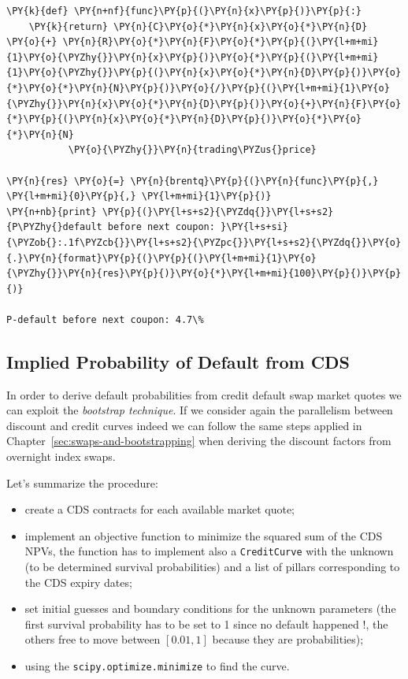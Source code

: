 \begin{attention}
\begin{Verbatim}[commandchars=\\\{\}]
\PY{k}{def} \PY{n+nf}{func}\PY{p}{(}\PY{n}{x}\PY{p}{)}\PY{p}{:}
    \PY{k}{return} \PY{n}{C}\PY{o}{*}\PY{n}{x}\PY{o}{*}\PY{n}{D} \PY{o}{+} \PY{n}{R}\PY{o}{*}\PY{n}{F}\PY{o}{*}\PY{p}{(}\PY{l+m+mi}{1}\PY{o}{\PYZhy{}}\PY{n}{x}\PY{p}{)}\PY{o}{*}\PY{p}{(}\PY{l+m+mi}{1}\PY{o}{\PYZhy{}}\PY{p}{(}\PY{n}{x}\PY{o}{*}\PY{n}{D}\PY{p}{)}\PY{o}{*}\PY{o}{*}\PY{n}{N}\PY{p}{)}\PY{o}{/}\PY{p}{(}\PY{l+m+mi}{1}\PY{o}{\PYZhy{}}\PY{n}{x}\PY{o}{*}\PY{n}{D}\PY{p}{)}\PY{o}{+}\PY{n}{F}\PY{o}{*}\PY{p}{(}\PY{n}{x}\PY{o}{*}\PY{n}{D}\PY{p}{)}\PY{o}{*}\PY{o}{*}\PY{n}{N}
           \PY{o}{\PYZhy{}}\PY{n}{trading\PYZus{}price}
	
\PY{n}{res} \PY{o}{=} \PY{n}{brentq}\PY{p}{(}\PY{n}{func}\PY{p}{,} \PY{l+m+mi}{0}\PY{p}{,} \PY{l+m+mi}{1}\PY{p}{)}
\PY{n+nb}{print} \PY{p}{(}\PY{l+s+s2}{\PYZdq{}}\PY{l+s+s2}{P\PYZhy{}default before next coupon: }\PY{l+s+si}{\PYZob{}:.1f\PYZcb{}}\PY{l+s+s2}{\PYZpc{}}\PY{l+s+s2}{\PYZdq{}}\PY{o}{.}\PY{n}{format}\PY{p}{(}\PY{p}{(}\PY{l+m+mi}{1}\PY{o}{\PYZhy{}}\PY{n}{res}\PY{p}{)}\PY{o}{*}\PY{l+m+mi}{100}\PY{p}{)}\PY{p}{)}

P-default before next coupon: 4.7\%
\end{Verbatim}
\end{attention}

\subsection{Implied Probability of Default from CDS}\label{default-probabilities-and-cds}

In order to derive default probabilities from credit default swap market quotes we can exploit the \emph{bootstrap technique}. If we consider again the parallelism between discount and credit curves indeed we can follow the same steps applied in Chapter~\ref{sec:swaps-and-bootstrapping}
when deriving the discount factors from overnight index swaps.

Let's summarize the procedure: 
\begin{itemize}
\tightlist
\item create a CDS contracts for each available market quote;
\item implement an objective function to minimize the squared sum of the CDS
	NPVs, the function has to implement also a \texttt{CreditCurve} with
	the unknown (to be determined survival probabilities) and a list of pillars corresponding to the CDS expiry dates;
\item set initial guesses and boundary conditions for the
	unknown parameters (the first survival probability has to be set to 1
	since no default happened !, the others free to move between $[0.01, 1]$ because they are probabilities);
\item using the \texttt{scipy.optimize.minimize} to find the curve.
\end{itemize}

